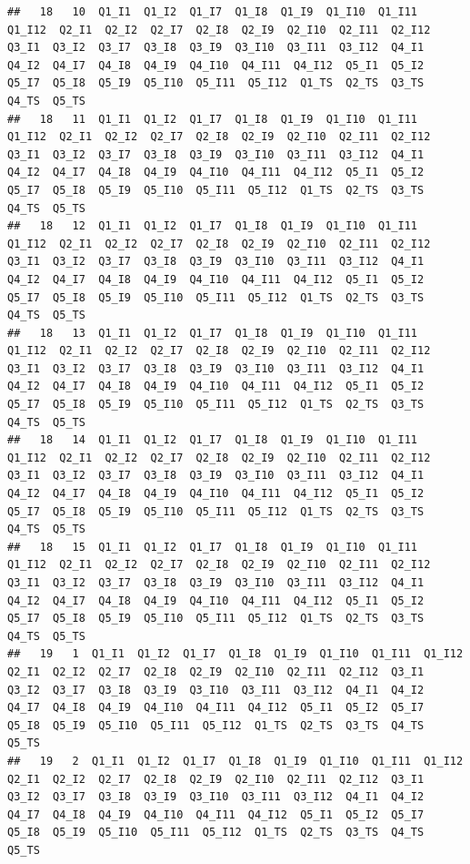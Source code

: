 \documentclass[
]{book}
\begin{document}
\begin{verbatim}
##   18   10  Q1_I1  Q1_I2  Q1_I7  Q1_I8  Q1_I9  Q1_I10  Q1_I11  Q1_I12  Q2_I1  Q2_I2  Q2_I7  Q2_I8  Q2_I9  Q2_I10  Q2_I11  Q2_I12  Q3_I1  Q3_I2  Q3_I7  Q3_I8  Q3_I9  Q3_I10  Q3_I11  Q3_I12  Q4_I1  Q4_I2  Q4_I7  Q4_I8  Q4_I9  Q4_I10  Q4_I11  Q4_I12  Q5_I1  Q5_I2  Q5_I7  Q5_I8  Q5_I9  Q5_I10  Q5_I11  Q5_I12  Q1_TS  Q2_TS  Q3_TS  Q4_TS  Q5_TS
##   18   11  Q1_I1  Q1_I2  Q1_I7  Q1_I8  Q1_I9  Q1_I10  Q1_I11  Q1_I12  Q2_I1  Q2_I2  Q2_I7  Q2_I8  Q2_I9  Q2_I10  Q2_I11  Q2_I12  Q3_I1  Q3_I2  Q3_I7  Q3_I8  Q3_I9  Q3_I10  Q3_I11  Q3_I12  Q4_I1  Q4_I2  Q4_I7  Q4_I8  Q4_I9  Q4_I10  Q4_I11  Q4_I12  Q5_I1  Q5_I2  Q5_I7  Q5_I8  Q5_I9  Q5_I10  Q5_I11  Q5_I12  Q1_TS  Q2_TS  Q3_TS  Q4_TS  Q5_TS
##   18   12  Q1_I1  Q1_I2  Q1_I7  Q1_I8  Q1_I9  Q1_I10  Q1_I11  Q1_I12  Q2_I1  Q2_I2  Q2_I7  Q2_I8  Q2_I9  Q2_I10  Q2_I11  Q2_I12  Q3_I1  Q3_I2  Q3_I7  Q3_I8  Q3_I9  Q3_I10  Q3_I11  Q3_I12  Q4_I1  Q4_I2  Q4_I7  Q4_I8  Q4_I9  Q4_I10  Q4_I11  Q4_I12  Q5_I1  Q5_I2  Q5_I7  Q5_I8  Q5_I9  Q5_I10  Q5_I11  Q5_I12  Q1_TS  Q2_TS  Q3_TS  Q4_TS  Q5_TS
##   18   13  Q1_I1  Q1_I2  Q1_I7  Q1_I8  Q1_I9  Q1_I10  Q1_I11  Q1_I12  Q2_I1  Q2_I2  Q2_I7  Q2_I8  Q2_I9  Q2_I10  Q2_I11  Q2_I12  Q3_I1  Q3_I2  Q3_I7  Q3_I8  Q3_I9  Q3_I10  Q3_I11  Q3_I12  Q4_I1  Q4_I2  Q4_I7  Q4_I8  Q4_I9  Q4_I10  Q4_I11  Q4_I12  Q5_I1  Q5_I2  Q5_I7  Q5_I8  Q5_I9  Q5_I10  Q5_I11  Q5_I12  Q1_TS  Q2_TS  Q3_TS  Q4_TS  Q5_TS
##   18   14  Q1_I1  Q1_I2  Q1_I7  Q1_I8  Q1_I9  Q1_I10  Q1_I11  Q1_I12  Q2_I1  Q2_I2  Q2_I7  Q2_I8  Q2_I9  Q2_I10  Q2_I11  Q2_I12  Q3_I1  Q3_I2  Q3_I7  Q3_I8  Q3_I9  Q3_I10  Q3_I11  Q3_I12  Q4_I1  Q4_I2  Q4_I7  Q4_I8  Q4_I9  Q4_I10  Q4_I11  Q4_I12  Q5_I1  Q5_I2  Q5_I7  Q5_I8  Q5_I9  Q5_I10  Q5_I11  Q5_I12  Q1_TS  Q2_TS  Q3_TS  Q4_TS  Q5_TS
##   18   15  Q1_I1  Q1_I2  Q1_I7  Q1_I8  Q1_I9  Q1_I10  Q1_I11  Q1_I12  Q2_I1  Q2_I2  Q2_I7  Q2_I8  Q2_I9  Q2_I10  Q2_I11  Q2_I12  Q3_I1  Q3_I2  Q3_I7  Q3_I8  Q3_I9  Q3_I10  Q3_I11  Q3_I12  Q4_I1  Q4_I2  Q4_I7  Q4_I8  Q4_I9  Q4_I10  Q4_I11  Q4_I12  Q5_I1  Q5_I2  Q5_I7  Q5_I8  Q5_I9  Q5_I10  Q5_I11  Q5_I12  Q1_TS  Q2_TS  Q3_TS  Q4_TS  Q5_TS
##   19   1  Q1_I1  Q1_I2  Q1_I7  Q1_I8  Q1_I9  Q1_I10  Q1_I11  Q1_I12  Q2_I1  Q2_I2  Q2_I7  Q2_I8  Q2_I9  Q2_I10  Q2_I11  Q2_I12  Q3_I1  Q3_I2  Q3_I7  Q3_I8  Q3_I9  Q3_I10  Q3_I11  Q3_I12  Q4_I1  Q4_I2  Q4_I7  Q4_I8  Q4_I9  Q4_I10  Q4_I11  Q4_I12  Q5_I1  Q5_I2  Q5_I7  Q5_I8  Q5_I9  Q5_I10  Q5_I11  Q5_I12  Q1_TS  Q2_TS  Q3_TS  Q4_TS  Q5_TS
##   19   2  Q1_I1  Q1_I2  Q1_I7  Q1_I8  Q1_I9  Q1_I10  Q1_I11  Q1_I12  Q2_I1  Q2_I2  Q2_I7  Q2_I8  Q2_I9  Q2_I10  Q2_I11  Q2_I12  Q3_I1  Q3_I2  Q3_I7  Q3_I8  Q3_I9  Q3_I10  Q3_I11  Q3_I12  Q4_I1  Q4_I2  Q4_I7  Q4_I8  Q4_I9  Q4_I10  Q4_I11  Q4_I12  Q5_I1  Q5_I2  Q5_I7  Q5_I8  Q5_I9  Q5_I10  Q5_I11  Q5_I12  Q1_TS  Q2_TS  Q3_TS  Q4_TS  Q5_TS

\end{verbatim}
\end{document}
